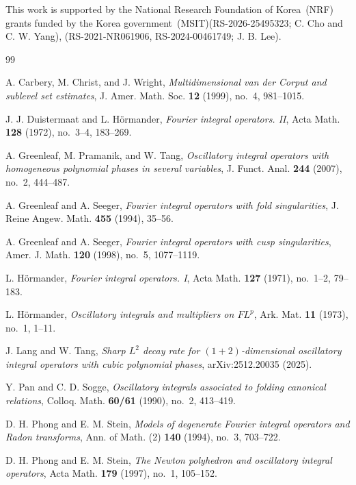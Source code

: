 \documentclass[10pt]{amsart}
\numberwithin{equation}{section}
\theoremstyle{definition}
\theoremstyle{remark}
\theoremstyle{remark}
\begin{document}
    This work is supported by the National Research Foundation of Korea~(NRF) grants funded by the Korea government~(MSIT)(RS-2026-25495323; C. Cho and C. W. Yang), (RS-2021-NR061906, RS-2024-00461749; J. B. Lee).
	
	
	

	\begin{thebibliography}{99}
		
		A. Carbery, M. Christ, and J. Wright,
		\emph{Multidimensional van der Corput and sublevel set estimates},
		J. Amer. Math. Soc. \textbf{12} (1999), no.~4, 981--1015.
		
		J. J. Duistermaat and L. H\"ormander,
		\emph{Fourier integral operators. II},
		Acta Math. \textbf{128} (1972), no.~3--4, 183--269.
		
		A. Greenleaf, M. Pramanik, and W. Tang,
		\emph{Oscillatory integral operators with homogeneous polynomial phases in several variables},
		J. Funct. Anal. \textbf{244} (2007), no.~2, 444--487.
		
		A. Greenleaf and A. Seeger,
		\emph{Fourier integral operators with fold singularities},
		J. Reine Angew. Math. \textbf{455} (1994), 35--56.
		
		A. Greenleaf and A. Seeger,
		\emph{Fourier integral operators with cusp singularities},
		Amer. J. Math. \textbf{120} (1998), no.~5, 1077--1119.
		
		L. H\"ormander,
		\emph{Fourier integral operators. I},
		Acta Math. \textbf{127} (1971), no.~1--2, 79--183.
		
		L. H\"ormander,
		\emph{Oscillatory integrals and multipliers on \(FL^p\)},
		Ark. Mat. \textbf{11} (1973), no.~1, 1--11.
		
		J. Lang and W. Tang,
		\emph{Sharp \(L^2\) decay rate for \((1+2)\)-dimensional oscillatory integral operators with cubic polynomial phases},
		arXiv:2512.20035 (2025).
		
		Y. Pan and C. D. Sogge,
		\emph{Oscillatory integrals associated to folding canonical relations},
		Colloq. Math. \textbf{60/61} (1990), no.~2, 413--419.
		
		D. H. Phong and E. M. Stein,
		\emph{Models of degenerate Fourier integral operators and Radon transforms},
		Ann. of Math. (2) \textbf{140} (1994), no.~3, 703--722.
		
		D. H. Phong and E. M. Stein,
		\emph{The Newton polyhedron and oscillatory integral operators},
		Acta Math. \textbf{179} (1997), no.~1, 105--152.
		

\end{thebibliography}
\end{document}

